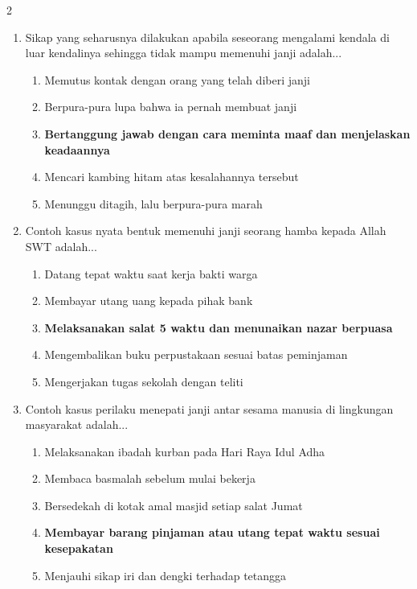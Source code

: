 \documentclass[10pt,a4paper]{article}
\begin{document}
\begin{multicols}{2}
\begin{enumerate}
    \item Sikap yang seharusnya dilakukan apabila seseorang mengalami kendala di luar kendalinya sehingga tidak mampu memenuhi janji adalah...
    \begin{enumerate}
      \item Memutus kontak dengan orang yang telah diberi janji
      \item Berpura-pura lupa bahwa ia pernah membuat janji
      \item \textbf{Bertanggung jawab dengan cara meminta maaf dan menjelaskan keadaannya}
      \item Mencari kambing hitam atas kesalahannya tersebut
      \item Menunggu ditagih, lalu berpura-pura marah
    \end{enumerate}

    \item Contoh kasus nyata bentuk memenuhi janji seorang hamba kepada Allah SWT adalah...
    \begin{enumerate}
      \item Datang tepat waktu saat kerja bakti warga
      \item Membayar utang uang kepada pihak bank
      \item \textbf{Melaksanakan salat 5 waktu dan menunaikan nazar berpuasa}
      \item Mengembalikan buku perpustakaan sesuai batas peminjaman
      \item Mengerjakan tugas sekolah dengan teliti
    \end{enumerate}

    \item Contoh kasus perilaku menepati janji antar sesama manusia di lingkungan masyarakat adalah...
    \begin{enumerate}
      \item Melaksanakan ibadah kurban pada Hari Raya Idul Adha
      \item Membaca basmalah sebelum mulai bekerja
      \item Bersedekah di kotak amal masjid setiap salat Jumat
      \item \textbf{Membayar barang pinjaman atau utang tepat waktu sesuai kesepakatan}
      \item Menjauhi sikap iri dan dengki terhadap tetangga
    \end{enumerate}


\end{enumerate}
\end{multicols}
\end{document}

